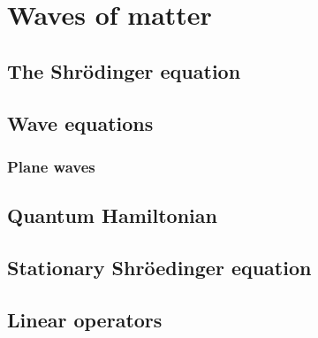 \chapter{Waves of matter}

\section{The Shr\"odinger equation}

\section{Wave equations}

  \subsection{Plane waves}

\section{Quantum Hamiltonian}

\section{Stationary Shr\"oedinger equation}

\section{Linear operators}
